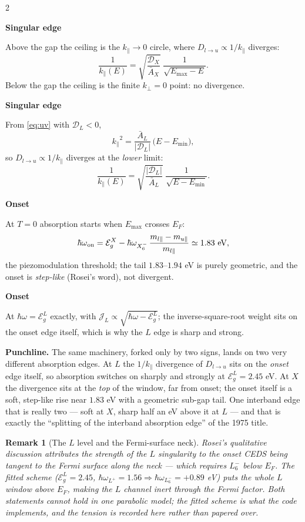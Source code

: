\documentclass[11pt,a4paper]{article}
\numberwithin{equation}{section}
\newcommand{\colstep}[1]{\par\vspace*{10pt}\noindent\textbf{#1}\par\nobreak\vspace*{3pt}\noindent\ignorespaces}
\newtheorem{remark}{Remark}[section]
\begin{document}
\begin{paracol}{2}
\switchcolumn*
\newpage
\colstep{Singular edge}
Above the gap the ceiling is the ${k_{\parallel}}\to0$ circle, where ${D_{l\to u}}\propto1/{k_{\parallel}}$ diverges:
\[\frac{1}{{k_{\parallel}}(E)}=\sqrt{\frac{{\mathcal{D}}_X}{{\bar{A}}_X}}\; \frac{1}{\sqrt{E_{\max}-E}} .\]
Below the gap the ceiling is the finite ${k_{\perp}}=0$ point: no divergence.
\switchcolumn
\colstep{Singular edge}
From \eqref{eq:uv} with ${\mathcal{D}}_L<0$,
\[{k_{\parallel}}^{2}=\frac{{\bar{A}}_L}{\vert{}{\mathcal{D}}_L\vert{}}\,\bigl(E-E_{\min}\bigr),\]
so ${D_{l\to u}}\propto1/{k_{\parallel}}$ diverges at the \emph{lower} limit:
\[\frac{1}{{k_{\parallel}}(E)}=\sqrt{\frac{\vert{}{\mathcal{D}}_L\vert{}}{{\bar{A}}_L}}\; \frac{1}{\sqrt{E-E_{\min}}} .\]
\switchcolumn*
\colstep{Onset}
At $T=0$ absorption starts when $E_{\max}$ crosses $E_F$:
\[{\hbar\omega}_{\rm on}={\mathcal{E}_g^{X}}-{\hbar\omega_{X_6^-}}\,\frac{m_{l\parallel}-m_{u\parallel}} {m_{l\parallel}}\simeq1.83\ \text{eV},\]
the piezomodulation threshold; the tail $1.83$--$1.94$ eV is purely geometric, and the onset is \emph{step-like} (Rosei's word), not divergent.
\switchcolumn
\colstep{Onset}
At ${\hbar\omega}={\mathcal{E}_g^{L}}$ exactly, with ${\mathcal{J}}_L\propto\sqrt{{\hbar\omega}-{\mathcal{E}_g^{L}}}$; the inverse-square-root weight sits on the onset edge itself, which is why the $L$ edge is sharp and strong.
\end{paracol}
\vspace{1em}
\bigskip
\noindent
\textbf{Punchline.}  The same machinery, forked only by two signs,
lands on two very different absorption edges.  At $L$ the $1/{k_{\parallel}}$
divergence of ${D_{l\to u}}$ sits on the \emph{onset} edge itself, so
absorption switches on sharply and strongly at ${\mathcal{E}_g^{L}}=2.45$ eV.  At
$X$ the divergence sits at the \emph{top} of the window, far from
onset; the onset itself is a soft, step-like rise near $1.83$ eV with
a geometric sub-gap tail. One interband edge that is really two ---
soft at $X$, sharp half an eV above it at $L$ --- and that is exactly
the ``splitting of the interband absorption edge'' of the 1975 title.

\begin{remark}[The $L$ level and the Fermi-surface neck]\label{rem:neck}
Rosei's qualitative discussion attributes the strength of the $L$
singularity to the onset CEDS being tangent to the Fermi surface along
the neck --- which requires $L_6^-$ \emph{below} $E_F$.  The fitted
scheme (${\mathcal{E}_g^{L}}=2.45$, ${\hbar\omega_{L^+}}=1.56\Rightarrow{\hbar\omega_{L_6^-}}=+0.89$ eV) puts the
whole $L$ window \emph{above} $E_F$, making the $L$ channel inert
through the Fermi factor.  Both statements cannot hold in one
parabolic model; the fitted scheme is what the code implements, and
the tension is recorded here rather than papered over.
\end{remark}
\end{document}
